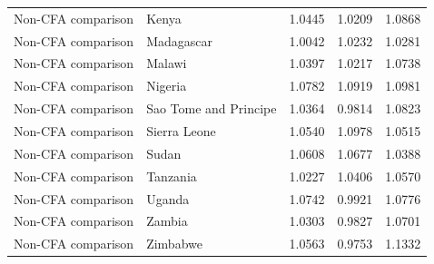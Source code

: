 \begin{table}
\begin{tabular}[t]{llrrr}
Non-CFA comparison & Kenya & 1.0445 & 1.0209 & 1.0868\\
\addlinespace
Non-CFA comparison & Madagascar & 1.0042 & 1.0232 & 1.0281\\
Non-CFA comparison & Malawi & 1.0397 & 1.0217 & 1.0738\\
Non-CFA comparison & Nigeria & 1.0782 & 1.0919 & 1.0981\\
Non-CFA comparison & Sao Tome and Principe & 1.0364 & 0.9814 & 1.0823\\
Non-CFA comparison & Sierra Leone & 1.0540 & 1.0978 & 1.0515\\
\addlinespace
Non-CFA comparison & Sudan & 1.0608 & 1.0677 & 1.0388\\
Non-CFA comparison & Tanzania & 1.0227 & 1.0406 & 1.0570\\
Non-CFA comparison & Uganda & 1.0742 & 0.9921 & 1.0776\\
Non-CFA comparison & Zambia & 1.0303 & 0.9827 & 1.0701\\
Non-CFA comparison & Zimbabwe & 1.0563 & 0.9753 & 1.1332\\
\bottomrule
\end{tabular}
\end{table}